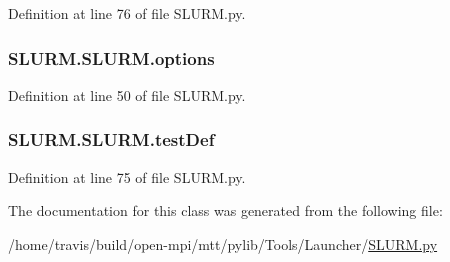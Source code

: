 Definition at line 76 of file S\-L\-U\-R\-M.\-py.

\hypertarget{class_s_l_u_r_m_1_1_s_l_u_r_m_a652a43986b8bda5c6ddb866ab0513ac8}{
\subsubsection[{options}]{\setlength{\rightskip}{0pt plus 5cm}S\-L\-U\-R\-M.\-S\-L\-U\-R\-M.\-options}}\label{class_s_l_u_r_m_1_1_s_l_u_r_m_a652a43986b8bda5c6ddb866ab0513ac8}


Definition at line 50 of file S\-L\-U\-R\-M.\-py.

\hypertarget{class_s_l_u_r_m_1_1_s_l_u_r_m_a9b08ef79e039a8524f1fa6712b45182b}{
\subsubsection[{test\-Def}]{\setlength{\rightskip}{0pt plus 5cm}S\-L\-U\-R\-M.\-S\-L\-U\-R\-M.\-test\-Def}}\label{class_s_l_u_r_m_1_1_s_l_u_r_m_a9b08ef79e039a8524f1fa6712b45182b}


Definition at line 75 of file S\-L\-U\-R\-M.\-py.



The documentation for this class was generated from the following file\-:\begin{DoxyCompactItemize}
\item 
/home/travis/build/open-\/mpi/mtt/pylib/\-Tools/\-Launcher/\hyperlink{_s_l_u_r_m_8py}{S\-L\-U\-R\-M.\-py}\end{DoxyCompactItemize}
